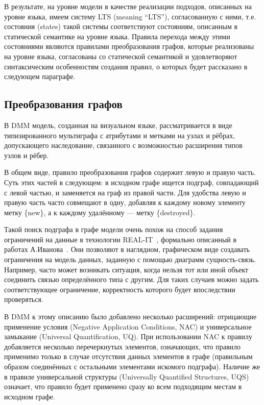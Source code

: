 \documentclass[a5paper]{article}
\begin{document}
В результате, на уровне модели в качестве реализации подходов, описанных на уровне языка, имеем систему LTS (meaning “LTS”), согласованную с ними, т.е. состояния (states) такой системы соответствуют состояниям, описанным в статической семантике на уровне языка. Правила перехода между этими состояниями являются правилами преобразования графов, которые реализованы на уровне языка, согласованы со статической семантикой и удовлетворяют синтаксическим особенностям создания правил, о которых будет рассказано в следующем параграфе.

\subsection{Преобразования графов}

В DMM модель, созданная на визуальном языке, рассматривается в виде типизированного мультиграфа с атрибутами и метками на узлах и рёбрах, допускающего наследование, связанного с возможностью расширения типов узлов и рёбер.

В общем виде, правило преобразования графов содержит левую и правую часть. Суть этих частей в следующем: в исходном графе ищется подграф, совпадающий с левой частью, и заменяется на граф из правой части. Для удобства левую и правую часть часто совмещают в одну, добавляя к каждому новому элементу метку \{new\}, а к каждому удалённому --- метку \{destroyed\}.

Такой поиск подграфа в графе модели очень похож на способ задания ограничений на данные в технологии REAL-IT~\cite{ivanov2}, формально описанный в работах А.Иванова~\cite{ivanov1, ivanov2, ivanov3}. Они позволяют в наглядном, графическом виде создавать ограничения на модель данных, заданную с помощью диаграмм сущность-связь. Например, часто может возникать ситуация, когда нельзя тот или иной объект соединить связью определённого типа с другим. Для таких случаев можно задать соответствующее ограничение, корректность которого будет впоследствии проверяться.

В DMM к этому описанию было добавлено несколько расширений: отрицающие применение условия (Negative Application Conditions, NAC) и универсальное замыкание (Universal Quantification, UQ). При использовании NAC к правилу добавляется несколько перечеркнутых элементов, означающих, что правило применимо только в случае отсутствия данных элементов в графе (правильным образом соединённых с остальными элементами искомого подграфа). Наличие же в правиле универсальной структуры (Universally Quantified Structures, UQS) означает, что правило будет применено сразу ко всем подходящим местам в исходном графе.
\end{document}

